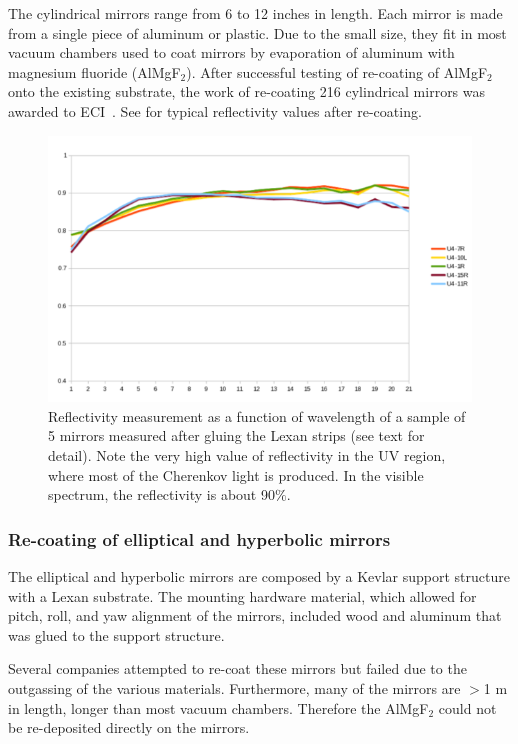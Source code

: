 The cylindrical mirrors range from 6 to 12 inches in length. Each mirror is made from a single piece of aluminum or plastic.
Due to the small size, they fit in most vacuum chambers used to coat mirrors by evaporation of aluminum with magnesium fluoride
(AlMgF$_2$). After successful testing of re-coating of AlMgF$_2$ onto the existing substrate, the work of re-coating 216 cylindrical mirrors
was awarded to ECI~\cite{ECI}. See  for typical reflectivity values after re-coating.

\begin{figure}[h]
	\centering
	\includegraphics[width=0.95\columnwidth,keepaspectratio]{img/mirrorsReflectivityAfter.png}
	\caption{Reflectivity measurement as a function of wavelength of a sample of 5 mirrors measured after gluing the Lexan strips (see text for detail).
            Note the very high value of reflectivity in the UV region, where most of the Cherenkov light is produced. In the visible spectrum,
            the reflectivity is about 90$\%$.}
	\label{fig:reflectivityAfter}
\end{figure}

\subsubsection{Re-coating of elliptical and hyperbolic mirrors}

The elliptical and hyperbolic mirrors are composed by a Kevlar support structure with a Lexan substrate. The mounting hardware
material, which allowed for pitch, roll, and yaw alignment of the mirrors, included wood and aluminum that was glued to the support structure.

Several companies attempted to re-coat these mirrors but failed due to the outgassing of the various materials. Furthermore, many of the mirrors
are $>$1 m in length, longer than most vacuum chambers. Therefore the AlMgF$_2$ could not be re-deposited directly on the mirrors.

